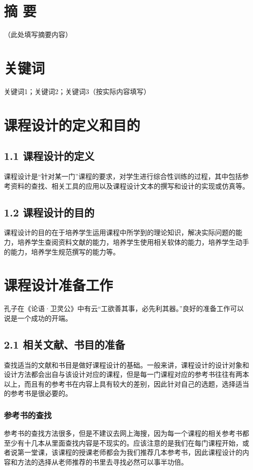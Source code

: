 \documentclass[12pt]{ctexart}
\begin{document}
\section*{摘 要}
\noindent （此处填写摘要内容）

\section*{关键词}
\noindent 关键词1；关键词2；关键词3（按实际内容填写）

\tableofcontents
{} %

\section{课程设计的定义和目的}
\subsection{1.1 课程设计的定义}
课程设计是“针对某一门”课程的要求，对学生进行综合性训练的过程，其中包括参考资料的查找、相关工具的应用以及课程设计文本的撰写和设计的实现或仿真等。

\subsection{1.2 课程设计的目的}
课程设计的目的在于培养学生运用课程中所学到的理论知识，解决实际问题的能力，培养学生查阅资料文献的能力，培养学生使用相关软体的能力，培养学生动手的能力，培养学生规范撰写的能力等。

\section{课程设计准备工作}
孔子在《论语·卫灵公》中有云“工欲善其事，必先利其器。”良好的准备工作可以说是一个成功的开端。

\subsection{2.1 相关文献、书目的准备}
查找适当的文献和书目是做好课程设计的基础。一般来讲，课程设计的设计对象和设计方法都会出自与该设计对应的课程，但是每一门课程对应的参考书往往有两本以上，而且有的参考书在内容上具有较大的差别，因此针对自己的选题，选择适当的参考书是很必要的。

\subsubsection{参考书的查找}
参考书的查找方法很多，但是不建议去网上海搜，因为每一个课程的相关参考书都至少有十几本从里面查找内容是不现实的。应该注意的是我们在每门课程开始，或者说第一堂课，该课程的授课老师都会为我们推荐几本参考书，因此课程设计的内容和方法的选择从老师推荐的书里去寻找必然可以事半功倍。
\end{document}
